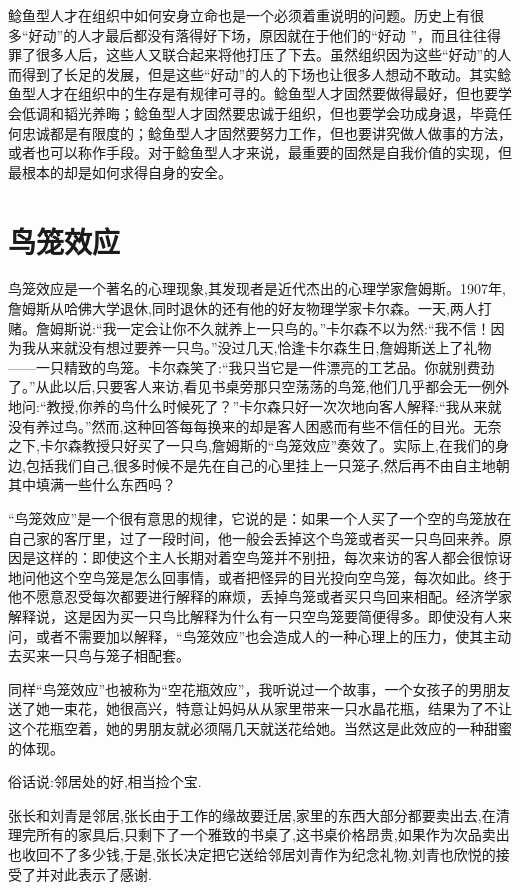 \documentclass[11pt]{ctexart}
\begin{document}
鲶鱼型人才在组织中如何安身立命也是一个必须着重说明的问题。历史上有很多“好动”的人才最后都没有落得好下场，原因就在于他们的“好动 ”，而且往往得罪了很多人后，这些人又联合起来将他打压了下去。虽然组织因为这些“好动”的人而得到了长足的发展，但是这些“好动”的人的下场也让很多人想动不敢动。其实鲶鱼型人才在组织中的生存是有规律可寻的。鲶鱼型人才固然要做得最好，但也要学会低调和韬光养晦；鲶鱼型人才固然要忠诚于组织，但也要学会功成身退，毕竟任何忠诚都是有限度的；鲶鱼型人才固然要努力工作，但也要讲究做人做事的方法，或者也可以称作手段。对于鲶鱼型人才来说，最重要的固然是自我价值的实现，但最根本的却是如何求得自身的安全。
\section{鸟笼效应}
\label{sec-74}


鸟笼效应是一个著名的心理现象,其发现者是近代杰出的心理学家詹姆斯。1907年,詹姆斯从哈佛大学退休,同时退休的还有他的好友物理学家卡尔森。一天,两人打赌。詹姆斯说:“我一定会让你不久就养上一只鸟的。”卡尔森不以为然:“我不信！因为我从来就没有想过要养一只鸟。”没过几天,恰逢卡尔森生日,詹姆斯送上了礼物——一只精致的鸟笼。卡尔森笑了:“我只当它是一件漂亮的工艺品。你就别费劲了。”从此以后,只要客人来访,看见书桌旁那只空荡荡的鸟笼,他们几乎都会无一例外地问:“教授,你养的鸟什么时候死了？”卡尔森只好一次次地向客人解释:“我从来就没有养过鸟。”然而,这种回答每每换来的却是客人困惑而有些不信任的目光。无奈之下,卡尔森教授只好买了一只鸟,詹姆斯的“鸟笼效应”奏效了。实际上,在我们的身边,包括我们自己,很多时候不是先在自己的心里挂上一只笼子,然后再不由自主地朝其中填满一些什么东西吗？

“鸟笼效应”是一个很有意思的规律，它说的是：如果一个人买了一个空的鸟笼放在自己家的客厅里，过了一段时间，他一般会丢掉这个鸟笼或者买一只鸟回来养。原因是这样的：即使这个主人长期对着空鸟笼并不别扭，每次来访的客人都会很惊讶地问他这个空鸟笼是怎么回事情，或者把怪异的目光投向空鸟笼，每次如此。终于他不愿意忍受每次都要进行解释的麻烦，丢掉鸟笼或者买只鸟回来相配。经济学家解释说，这是因为买一只鸟比解释为什么有一只空鸟笼要简便得多。即使没有人来问，或者不需要加以解释，“鸟笼效应”也会造成人的一种心理上的压力，使其主动去买来一只鸟与笼子相配套。

同样“鸟笼效应”也被称为“空花瓶效应”，我听说过一个故事，一个女孩子的男朋友送了她一束花，她很高兴，特意让妈妈从从家里带来一只水晶花瓶，结果为了不让这个花瓶空着，她的男朋友就必须隔几天就送花给她。当然这是此效应的一种甜蜜的体现。

俗话说:邻居处的好,相当捡个宝.

张长和刘青是邻居,张长由于工作的缘故要迁居,家里的东西大部分都要卖出去,在清理完所有的家具后,只剩下了一个雅致的书桌了,这书桌价格昂贵,如果作为次品卖出也收回不了多少钱,于是,张长决定把它送给邻居刘青作为纪念礼物,刘青也欣悦的接受了并对此表示了感谢.
\end{document}
